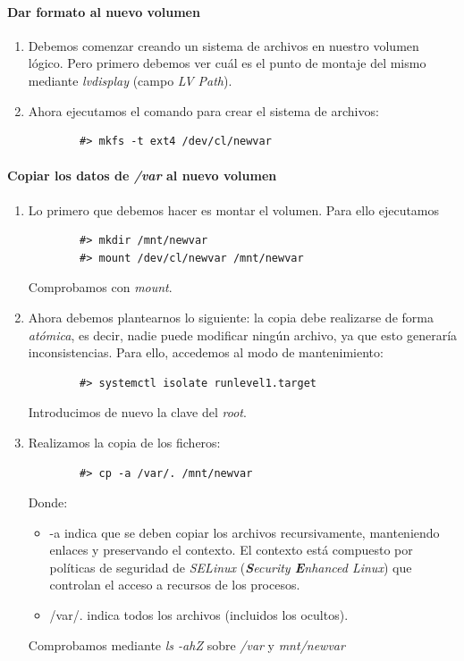 \documentclass[12pt,spanish]{article}
\begin{document}
\paragraph{Dar formato al nuevo volumen}
\begin{enumerate}
	\item Debemos comenzar creando un sistema de archivos en nuestro volumen lógico. Pero primero debemos ver cuál es el punto de montaje del mismo mediante \textit{lvdisplay} (campo \textit{LV Path}).
	\item Ahora ejecutamos el comando para crear el sistema de archivos:
	\begin{lstlisting}
		#> mkfs -t ext4 /dev/cl/newvar
	\end{lstlisting}
\end{enumerate}

\paragraph{Copiar los datos de \textit{/var} al nuevo volumen}
\begin{enumerate}
	\item Lo primero que debemos hacer es montar el volumen. Para ello ejecutamos
	\begin{lstlisting}
		#> mkdir /mnt/newvar
		#> mount /dev/cl/newvar /mnt/newvar
	\end{lstlisting}
	Comprobamos con \textit{mount}.
	\item Ahora debemos plantearnos lo siguiente: la copia debe realizarse de forma \emph{atómica}, es decir, nadie puede modificar ningún archivo, ya que esto generaría inconsistencias. Para ello, accedemos al modo de mantenimiento:
	\begin{lstlisting}
		#> systemctl isolate runlevel1.target
	\end{lstlisting}
	Introducimos de nuevo la clave del \textit{root}.
	\item Realizamos la copia de los ficheros:
	\begin{lstlisting}
		#> cp -a /var/. /mnt/newvar
	\end{lstlisting}
	Donde:
	\begin{itemize}
		\item -a indica que se deben copiar los archivos recursivamente, manteniendo enlaces y preservando el contexto. El contexto está compuesto por políticas de seguridad de \textit{SELinux} (\textit{\textbf{S}ecurity \textbf{E}nhanced Linux}) que controlan el acceso a recursos de los procesos.
		\item /var/. indica todos los archivos (incluidos los ocultos).
	\end{itemize}
	Comprobamos mediante \textit{ls -ahZ} sobre \textit{/var} y \textit{mnt/newvar}
\end{enumerate}
\end{document}

